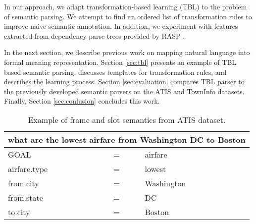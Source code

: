 \documentclass{article}
\begin{document}

In our approach, we adapt transformation-based learning (TBL) \cite{brill95} to the problem of semantic parsing. We attempt to find an ordered list of transformation rules to improve naive semantic annotation. In addition, we experiment with features extracted from dependency parse trees provided by RASP \cite{rasp06}.


In the next section, we describe previous work on mapping natural language into formal meaning representation. Section \ref{sec:tbl} presents an example of TBL based semantic parsing, discusses templates for transformation rules, and describes the learning process. Section \ref{sec:evaluation} compares TBL parser to the previously developed semantic parsers on the ATIS \cite{atis94} and TownInfo \cite{mairesse09} datasets. Finally, Section \ref{sec:conlusion} concludes this work.

\begin{table}
\begin{center}
\begin{tabular}{lll} 
  \multicolumn{3}{l}{what are the lowest airfare from Washington DC to Boston} \\
  \hline
  GOAL          & = & airfare \\
  airfare.type  & = & lowest \\
  from.city     & = & Washington \\
  from.state    & = & DC \\
  to.city       & = & Boston \\
\end{tabular} 
\end{center}
\vspace{-0.5cm}
\caption{Example of frame and slot semantics from ATIS \cite{atis94} dataset.}
\label{tbl:sem:example}
\end{table}
\end{document}
